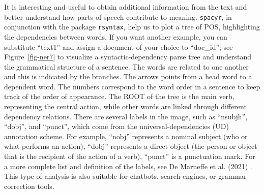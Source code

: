It is interesting and useful to obtain additional information from the
text and better understand how parts of speech contribute to meaning.
\texttt{spacyr}, in conjunction with the package \texttt{rsyntax}, help
us to plot a tree of POS, highlighting the dependencies between words. If you
want another example, you can substitute ``text1'' and assign a document of your choice to
``doc\_id''; see Figure~\ref{fig-ner7} to
visualize a syntactic-dependency parse tree and understand the
grammatical structure of a sentence. The words are related to one another
and this is indicated by the branches. The arrows points from a head
word to a dependent word. The numbers correspond to the word order in a
sentence to keep track of the order of appearance. The ROOT of the tree
is the main verb, representing the central action, while other words are
linked through different dependency relations. There are several labels
in the image, such as ``nsubjh'', ``dobj'', and ``punct'', which come from
the universal-dependencies (UD) annotation scheme. For example, ``nobj''
represents a nominal subject (who or what performs an action), ``dobj''
represents a direct object (the person or object that is the recipient of the action of a verb),
``punct'' is a punctuation mark. For a more complete list and definition of
the labels, see De Marneffe et al. (2021) . This type of analysis is
also suitable for chatbots, search engines, or grammar-correction tools.

\begin{Shaded}
\begin{Highlighting}[]

\OtherTok{\textless{}{-}} \SpecialCharTok{$} \NormalTok{)}

\NormalTok{(}
   \NormalTok{, }
   \NormalTok{(}\NormalTok{, }\NormalTok{),}
   \NormalTok{,}
   \NormalTok{,}
   
\NormalTok{)}
\end{Highlighting}
\end{Shaded}

